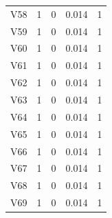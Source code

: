 \documentclass[a4paper, 12pt, openright, oneside, german, french, english, brazil]{abntex2}
\begin{document}
\begin{SingleSpace}
\begin{footnotesize}
\begin{center}
\begin{longtable}{c c c c c}
					V58 & 1 & 0 & 0.014 & 1 \\ 
					V59 & 1 & 0 & 0.014 & 1 \\ 
					V60 & 1 & 0 & 0.014 & 1 \\ 
					V61 & 1 & 0 & 0.014 & 1 \\ 
					V62 & 1 & 0 & 0.014 & 1 \\ 
					V63 & 1 & 0 & 0.014 & 1 \\ 
					V64 & 1 & 0 & 0.014 & 1 \\ 
					V65 & 1 & 0 & 0.014 & 1 \\ 
					V66 & 1 & 0 & 0.014 & 1 \\ 
					V67 & 1 & 0 & 0.014 & 1 \\ 
					V68 & 1 & 0 & 0.014 & 1 \\ 
					V69 & 1 & 0 & 0.014 & 1 \\ 
					
				\end{longtable}
			\end{center}
		\end{footnotesize}
	\end{SingleSpace}
	
\end{document}
